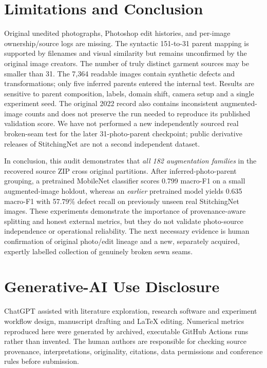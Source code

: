 \documentclass[conference,a4paper]{IEEEtran}
\begin{document}
\section{Limitations and Conclusion}
Original unedited photographs, Photoshop edit histories, and per-image ownership/source logs are missing. The syntactic 151-to-31 parent mapping is supported by filenames and visual similarity but remains unconfirmed by the original image creators. The number of truly distinct garment sources may be smaller than 31. The 7,364 readable images contain synthetic defects and transformations; only five inferred parents entered the internal test. Results are sensitive to parent composition, labels, domain shift, camera setup and a single experiment seed. The original 2022 record also contains inconsistent augmented-image counts and does not preserve the run needed to reproduce its published validation score. We have not performed a new independently sourced real broken-seam test for the later 31-photo-parent checkpoint; public derivative releases of StitchingNet are not a second independent dataset.

In conclusion, this audit demonstrates that \emph{all 182 augmentation families} in the recovered source ZIP cross original partitions. After inferred-photo-parent grouping, a pretrained MobileNet classifier scores 0.799 macro-F1 on a small augmented-image holdout, whereas an \emph{earlier} pretrained model yields 0.635 macro-F1 with 57.79\% defect recall on previously unseen real StitchingNet images. These experiments demonstrate the importance of provenance-aware splitting and honest external metrics, but they do not validate photo-source independence or operational reliability. The next necessary evidence is human confirmation of original photo/edit lineage and a new, separately acquired, expertly labelled collection of genuinely broken sewn seams.

\section*{Generative-AI Use Disclosure}
ChatGPT assisted with literature exploration, research software and experiment workflow design, manuscript drafting and LaTeX editing. Numerical metrics reproduced here were generated by archived, executable GitHub Actions runs rather than invented. The human authors are responsible for checking source provenance, interpretations, originality, citations, data permissions and conference rules before submission.
\end{document}

